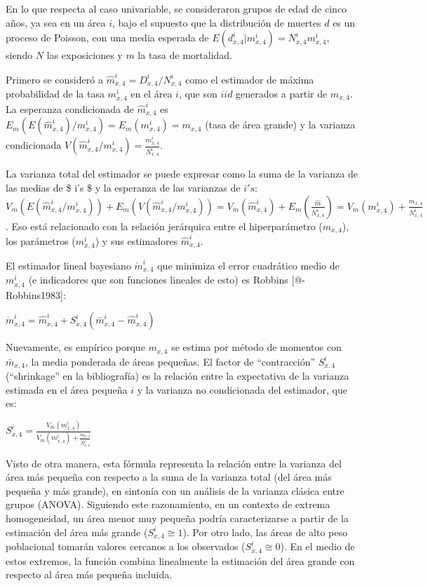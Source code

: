 \documentclass[12pt,]{article}
\begin{document}
En lo que respecta al caso univariable, se consideraron grupos de edad
de cinco años, ya sea en un área \(i\), bajo el supuesto que la
distribución de muertes \(d\) es un proceso de Poisson, con una media
esperada de \(E(d_ {x,4}^{i}|{m_{x,4}^{i}})=N_{x,4}^{i}m_{x,4}^{i}\),
siendo \(N\) las exposiciones y \(m\) la tasa de mortalidad.

Primero se consideró a \(\hat{m}_{x,4}^{i}=D_{x,4}^{i}/N_{x,4}^{i}\)
como el estimador de máxima probabilidad de la tasa \(m_{x,4}^{i}\) en
el área \(i\), que son \(iid\) generados a partir de \(m_{x,4}\). La
esperanza condicionada de \(\hat{m}_{x,4}^{i}\) es
\(E_{m}(E({\hat{m}}_{x,4}^{i})/m_{x,4}^{i})=E_{m}({m_{x, 4}^{i}}) = m_{x,4}\)
(tasa de área grande) y la varianza condicionada
\(V({\hat{m}}_{x,4}^{i}/m_{x,4}^{i})=\frac{m_{x,4}^{i}}{N_{x,4}^{i}}\).

La varianza total del estimador se puede expresar como la suma de la
varianza de las medias de \$ i's \$ y la esperanza de las varianzas de
\(i's\):
\(V_{m}(E(\hat{m}_{x,4}^{i}/m_{x,4}^{i}))+E_{m}(V({\hat{m}}_{x,4}^ {i}/m_{x,4}^{i}))=V_{m}(\hat{m}_{x,4}^{i})+E_{m}(\frac{{\hat{m}}}{N_{x,4}^{i}})=V_{m}(m_{x,4}^{i})+\frac{m_{x, 4}}{N_{x,4}^{i}}\).
Eso está relacionado con la relación jerárquica entre el hiperparámetro
(\(m_{x, 4}\)), los parámetros (\(m_{x,4}^{i}\)) y sus estimadores
\(\hat{m}_{x,4}^{i}\).

El estimador lineal bayesiano \(\mathring{m}_{x, 4}^{i}\) que minimiza
el error cuadrático medio de \({m}_{x,4}^{i}\) (e indicadores que son
funciones lineales de esto) es Robbins {[}@-Robbins1983{]}:

\(\mathring{m}_{x,4}^{i}=\hat{m}_{x, 4}^{i}+S_{x,4}^{i}(\bar{m}_{x,4}^{i}-\hat{m}_{x,4}^{i})\)

Nuevamente, es empírico porque \(m_{x,4}\) se estima por método de
momentos con \(\bar{m}_{x,4}\), la media ponderada de áreas pequeñas. El
factor de ``contracción'' \(S_{x, 4}^{i}\) (``shrinkage'' en la
bibliografía) es la relación entre la expectativa de la varianza
estimada en el área pequeña \(i\) y la varianza no condicionada del
estimador, que es:

\(S_{x,4}^{i}=\frac{V_{m}(m_{x,4}^{i})}{V_{m}(m_{x,4}^{i})+\frac{m_{x,4}}{N_{x,4}^{i}}}\)

Visto de otra manera, esta fórmula representa la relación entre la
varianza del área más pequeña con respecto a la suma de la varianza
total (del área más pequeña y más grande), en sintonía con un análisis
de la varianza clásica entre grupos (ANOVA). Siguiendo este
razonamiento, en un contexto de extrema homogeneidad, un área menor muy
pequeña podría caracterizarse a partir de la estimación del área más
grande (\(S_{x, 4} ^ {i} \cong 1\)). Por otro lado, las áreas de alto
peso poblacional tomarán valores cercanos a los observados
(\(S_{x,4}^{i}\cong 0\)). En el medio de estos extremos, la función
combina linealmente la estimación del área grande con respecto al área
más pequeña incluida.
\end{document}

